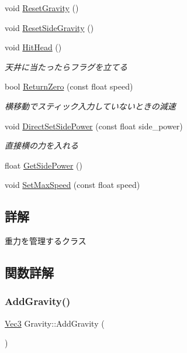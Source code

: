 \begin{DoxyCompactItemize}
void \mbox{\hyperlink{class_gravity_aa334a7ebbbd79ca28e7d29c3fc5c03ed}{Reset\+Gravity}} ()
\item 
void \mbox{\hyperlink{class_gravity_a5e430e10dea748f20c2d019e86dd339c}{Reset\+Side\+Gravity}} ()
\item 
void \mbox{\hyperlink{class_gravity_a56fa68b18b0426bdb267850e1917eb05}{Hit\+Head}} ()
\begin{DoxyCompactList}\small\item\em 天井に当たったらフラグを立てる \end{DoxyCompactList}\item 
bool \mbox{\hyperlink{class_gravity_a1efc862b822ca8cfea80b066ed4479f9}{Return\+Zero}} (const float speed)
\begin{DoxyCompactList}\small\item\em 横移動でスティック入力していないときの減速 \end{DoxyCompactList}\item 
void \mbox{\hyperlink{class_gravity_a015bda4dc0019baaa70378e1d6715a55}{Direct\+Set\+Side\+Power}} (const float side\+\_\+power)
\begin{DoxyCompactList}\small\item\em 直接横の力を入れる \end{DoxyCompactList}\item 
float \mbox{\hyperlink{class_gravity_a32728f5db170dedc5a2a5282c7ec1a78}{Get\+Side\+Power}} ()
\item 
void \mbox{\hyperlink{class_gravity_a74d50df160f70b19f82e382b2a90be3e}{Set\+Max\+Speed}} (const float speed)
\end{DoxyCompactItemize}


\subsection{詳解}
重力を管理するクラス 

\subsection{関数詳解}
\mbox{\label{class_gravity_aaa4ff8499bad48efebed909ab16b6dfa}} 
\subsubsection{\texorpdfstring{Add\+Gravity()}{AddGravity()}}
{\footnotesize\ttfamily \mbox{\hyperlink{common_8h_ab1cb35b3a17c398d8ef71d5f779808bf}{Vec3}} Gravity\+::\+Add\+Gravity (\begin{DoxyParamCaption}{ }\end{DoxyParamCaption})}



